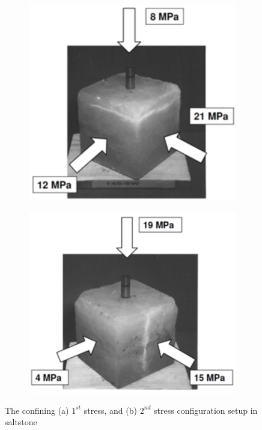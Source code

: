 \begin{figure}[!ht]
\begin{subfigure}[c]{0.48\textwidth}
\includegraphics[width=1\textwidth]{figures/Amir_ME2_stress_state_1.png}
\subcaption{}
\label{fig:Amir_ME2_stress_state_a}
\end{subfigure}
\hfill
\begin{subfigure}[c]{0.48\textwidth}
\includegraphics[width=1\textwidth]{figures/Amir_ME2_stress_state_2.png}
\subcaption{}
\label{fig:Amir_ME2_stress_state_b}
\end{subfigure}
\caption{The confining (a) $1^{st}$ stress, and (b) $2^{nd}$ stress configuration setup in saltstone \cite{Kamlot2009}}
\end{figure}

